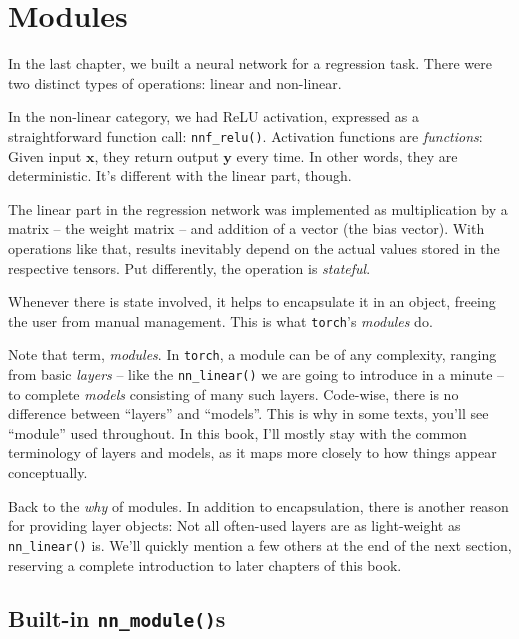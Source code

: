 \documentclass[
  letterpaper,
]{krantz}
\begin{document}
\hypertarget{sec:modules}{%
\chapter{Modules}\label{sec:modules}}

In the last chapter, we built a neural network for a regression task.
There were two distinct types of operations: linear and non-linear.

In the non-linear category, we had ReLU activation, expressed as a
straightforward function call: \texttt{nnf\_relu()}. Activation
functions are \emph{functions}: Given input \(\mathbf{x}\), they return
output \(\mathbf{y}\) every time. In other words, they are
deterministic. It's different with the linear part, though.

The linear part in the regression network was implemented as
multiplication by a matrix -- the weight matrix -- and addition of a
vector (the bias vector). With operations like that, results inevitably
depend on the actual values stored in the respective tensors. Put
differently, the operation is \emph{stateful}.

Whenever there is state involved, it helps to encapsulate it in an
object, freeing the user from manual management. This is what
\texttt{torch}'s \emph{modules} do.

Note that term, \emph{modules}. In
\texttt{torch}, a module can be of any complexity, ranging from basic
\emph{layers} -- like the \texttt{nn\_linear()} we are going to
introduce in a minute -- to complete \emph{models} consisting of many
such layers. Code-wise, there is no difference between
``layers'' and
``models''. This is why in some texts, you'll
see ``module'' used throughout. In this book, I'll mostly stay with the
common terminology of layers and models, as it maps more closely to how
things appear conceptually.

Back to the \emph{why} of modules. In addition to encapsulation, there
is another reason for providing layer objects: Not all often-used layers
are as light-weight as \texttt{nn\_linear()} is. We'll quickly mention a
few others at the end of the next section, reserving a complete
introduction to later chapters of this book.

\hypertarget{built-in-nn_modules}{%
\section{\texorpdfstring{Built-in
\texttt{nn\_module()}s}{Built-in nn\_module()s}}\label{built-in-nn_modules}}
\end{document}
